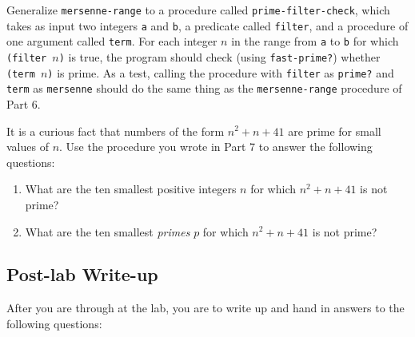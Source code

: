 \labpart Generalize {\tt mersenne-range} to a procedure called
{\tt prime-filter-check}, which takes as input two integers {\tt a} and
{\tt b}, a predicate called {\tt filter}, and a procedure of one argument
called {\tt term}.  For each integer $n$ in the range from {\tt a} to
{\tt b} for which {\tt (filter $n$)} is true, the program should check (using
{\tt fast-prime?}) whether {\tt (term $n$)} is prime.  As a test, calling the
procedure with {\tt filter} as {\tt prime?} and {\tt term} as {\tt mersenne}
should do the same thing as the {\tt mersenne-range} procedure of Part
6.

\labpart It is a curious fact that numbers of the form $n^2 + n + 41$
are prime for small values of $n$.  Use the procedure
you wrote in Part 7 to answer the following questions: 

\begin{enumerate}

\item What are the ten smallest positive integers $n$ for which $n^2 + n + 41$
is not prime? 

\item What are the ten smallest {\em primes} $p$ for which $n^2 + n + 41$
is not prime?
\end{enumerate}

\subsection{Post-lab Write-up}

After you are through at the lab, you are to write up and
hand in answers to the following questions:

